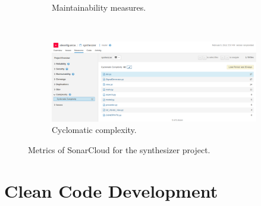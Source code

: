 \documentclass[margin,line,a4paper,authoryear,12pt]{report}
\begin{document}
\begin{figure}[h!]
\begin{subfigure}{0.4\linewidth}
        \caption{Maintainability measures. }
        \label{fig:SonarCloud}
    \end{subfigure}
    \\
    \begin{subfigure}{\linewidth}
        \centering
        \includegraphics[width=\linewidth]{cyclomatic_complexity.png}
        \caption{Cyclomatic complexity. }
        \label{fig:SonarCloud}
    \end{subfigure}
    \caption{Metrics of SonarCloud for the synthesizer project.}
\end{figure}

\chapter{Clean Code Development}
\end{document}
